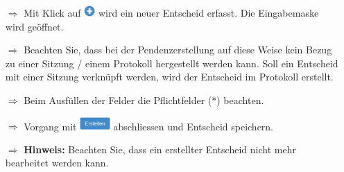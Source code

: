 \documentclass{article}
\begin{document}
\begin{multicols}{2}
\begin{tcolorbox}[colback=blue!5,colframe=blue!40!black,title=Neue Entscheide erstellen]
\begin{itemize}
  \item[$\Longrightarrow$] Mit Klick auf \includegraphics[height=12pt]{Icons/Plussymbol.png} wird ein neuer Entscheid erfasst. Die Eingabemaske wird geöffnet.
  \item[$\Longrightarrow$] Beachten Sie, dass bei der Pendenzerstellung auf diese Weise kein Bezug zu einer Sitzung / einem Protokoll hergestellt werden kann. Soll ein Entscheid mit einer Sitzung verknüpft werden, wird der Entscheid im Protokoll erstellt.
  \item[$\Longrightarrow$] Beim Ausfüllen der Felder die Pflichtfelder (*) beachten.
  \item[$\Longrightarrow$] Vorgang mit \includegraphics[height=14pt]{Icons/B_Erstellen.png} abschliessen und Entscheid speichern.
	\item[$\Longrightarrow$] \textbf{Hinweis:} Beachten Sie, dass ein erstellter Entscheid nicht mehr bearbeitet werden kann.
\end{itemize}
\end{tcolorbox}

\end{multicols}
\end{document}
